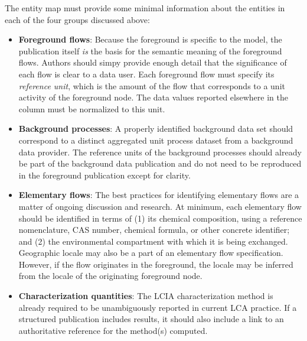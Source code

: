 
The entity map must provide some minimal information about the entities in each of the four groups discussed above:
\begin{itemize}
\item \textbf{Foreground flows}: Because the foreground is specific to the model, the publication itself \emph{is} the basis for the semantic meaning of the foreground flows. Authors should simpy provide enough detail that the significance of each flow is clear to a data user.  Each foreground flow must specify its \emph{reference unit}, which is the amount of the flow that corresponds to a unit activity of the foreground node.  The data values reported elsewhere in the column must be normalized to this unit.
\item \textbf{Background processes}: A properly identified background data set should correspond to a distinct aggregated unit process dataset from a background data provider.  The reference units of the background processes should already be part of the background data publication and do not need to be reproduced in the foreground publication except for clarity.  
\item \textbf{Elementary flows}: The best practices for identifying elementary flows are a matter of ongoing discussion and research.  At minimum, each elementary flow should be identified in terms of (1) its chemical composition, using a reference nomenclature, CAS number, chemical formula, or other concrete identifier; and (2) the environmental compartment with which it is being exchanged.  Geographic locale may also be a part of an elementary flow specification.  However, if the flow originates in the foreground, the locale may be inferred from the locale of the originating foreground node.
  \item \textbf{Characterization quantities}: The LCIA characterization method is already required to be unambiguously reported in current LCA practice.  If a structured publication includes results, it should also include a link to an authoritative reference for the method(s) computed.  
\end{itemize}


